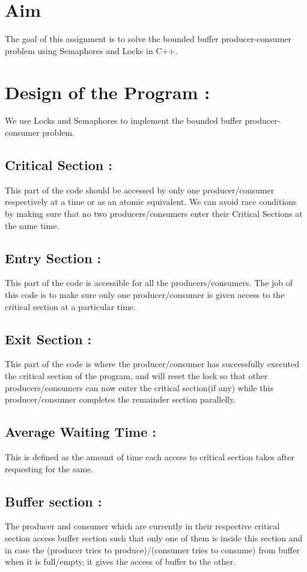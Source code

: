 \documentclass[12pt]{article}
\begin{document}
\maketitle

\section{Aim}
The goal of this assignment is to solve the bounded buffer producer-consumer problem using Semaphores and Locks
in C++.

\section{Design of the Program :}
We use Locks and Semaphores to implement the bounded buffer producer-consumer problem.
\subsection{Critical Section :}
This part of the code should be accessed by only one producer/consumer respectively at a time or as an atomic equivalent.
We can avoid race conditions by making sure that no two producers/consumers enter their Critical Sections at the same time.
\subsection{Entry Section :}
This part of the code is accessible for all the producers/consumers. The job of this code is to make sure only one producer/consumer is given access to the critical section at a particular time.
\subsection{Exit Section :}
This part of the code is where the producer/consumer has successfully executed the critical section of the program, and will reset the lock so that other producers/consumers can now enter the critical section(if any) while this producer/consumer completes the remainder section parallelly.
\subsection{Average Waiting Time :}
This is defined as the amount of time each access to critical section takes after requesting for the same.
\subsection{Buffer section :}
The producer and consumer which are currently in their respective critical section access buffer section such that only one of them is inside this section and in case the (producer tries to produce)/(consumer tries to consume) from buffer when it is full/empty, it gives the access of buffer to the other.
\end{document}
